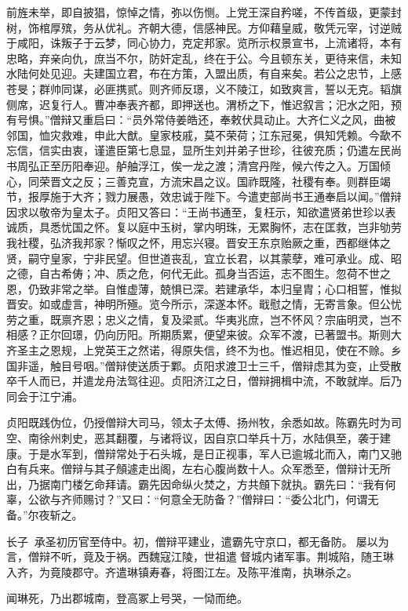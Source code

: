 \documentclass[12pt,UTF8]{ctexbook}
\begin{document}
前旌未举，即自披猖，惊悼之情，弥以伤恻。上党王深自矜嗟，不传首级，更蒙封树，饰棺厚殡，务从优礼。齐朝大德，信感神民。方仰藉皇威，敬凭元宰，讨逆贼于咸阳，诛叛子于云梦，同心协力，克定邦家。览所示权景宣书，上流诸将，本有忠略，弃亲向仇，庶当不尔，防奸定乱，终在于公。今且顿东关，更待来信，未知水陆何处见迎。夫建国立君，布在方策，入盟出质，有自来矣。若公之忠节，上感苍旻；群帅同谋，必匪携贰。则齐师反璟，义不陵江，如致爽言，誓以无克。韬旗侧席，迟复行人。曹冲奉表齐都，即押送也。渭桥之下，惟迟叙言；汜水之阳，预有号惧。”僧辩又重启曰：“员外常侍姜皓还，奉敕伏具动止。大齐仁义之风，曲被邻国，恤灾救难，申此大猷。皇家枝戚，莫不荣荷；江东冠冕，俱知凭赖。今歃不忘信，信实由衷，谨遣臣第七息显，显所生刘并弟子世珍，往彼充质；仍遣左民尚书周弘正至历阳奉迎。舻舳浮江，俟一龙之渡；清宫丹陛，候六传之入。万国倾心，同荣晋文之反；三善克宣，方流宋昌之议。国祚既隆，社稷有奉。则群臣竭节，报厚施于大齐；戮力展愚，效忠诚于陛下。今遣吏部尚书王通奉启以闻。”僧辩因求以敬帝为皇太子。贞阳又答曰：“王尚书通至，复枉示，知欲遣贤弟世珍以表诚质，具悉忧国之怀。复以庭中玉树，掌内明珠，无累胸怀，志在匡救，岂非劬劳我社稷，弘济我邦家？惭叹之怀，用忘兴寝。晋安王东京贻厥之重，西都继体之贤，嗣守皇家，宁非民望。但世道丧乱，宜立长君，以其蒙孽，难可承业。成、昭之德，自古希俦；冲、质之危，何代无此。孤身当否运，志不图生。忽荷不世之恩，仍致非常之举。自惟虚薄，兢惧已深。若建承华，本归皇胄；心口相誓，惟拟晋安。如或虚言，神明所殛。览今所示，深遂本怀。戢慰之情，无寄言象。但公忧劳之重，既禀齐恩；忠义之情，复及梁贰。华夷兆庶，岂不怀风？宗庙明灵，岂不相感？正尔回璟，仍向历阳。所期质累，便望来彼。众军不渡，已著盟书。斯则大齐圣主之恩规，上党英王之然诺，得原失信，终不为也。惟迟相见，使在不赊。乡国非遥，触目号咽。”僧辩使送质于鄴。贞阳求渡卫士三千，僧辩虑其为变，止受散卒千人而已，并遣龙舟法驾往迎。贞阳济江之日，僧辩拥楫中流，不敢就岸。后乃同会于江宁浦。

贞阳既践伪位，仍授僧辩大司马，领太子太傅、扬州牧，余悉如故。陈霸先时为司空、南徐州刺史，恶其翻覆，与诸将议，因自京口举兵十万，水陆俱至，袭于建康。于是水军到，僧辩常处于石头城，是日正视事，军人已逾城北而入，南门又驰白有兵来。僧辩与其子頠遽走出阁，左右心腹尚数十人。众军悉至，僧辩计无所出，乃据南门楼乞命拜请。霸先因命纵火焚之，方共頠下就执。霸先曰：“我有何辜，公欲与齐师赐讨？”又曰：“何意全无防备？”僧辩曰：“委公北门，何谓无备。”尔夜斩之。

长子，承圣初历官至侍中。初，僧辩平建业，遣霸先守京口，都无备防。屡以为言，僧辩不听，竟及于祸。西魏寇江陵，世祖遣督城内诸军事。荆城陷，随王琳入齐，为竟陵郡守。齐遣琳镇寿春，将图江左。及陈平淮南，执琳杀之。

闻琳死，乃出郡城南，登高冢上号哭，一恸而绝。
\end{document}
